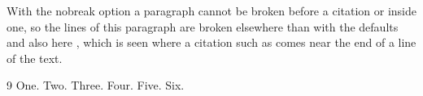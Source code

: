 \documentclass{article}
\begin{document}
With the nobreak option a paragraph cannot be broken before a citation or inside one, so the lines of this paragraph are broken elsewhere than with the defaults \cite[see the long note here]{a,c,e} and also here \cite{b,a,f,e,d}, which is seen where a citation such as \cite{a,c,e} comes near the end of a line of the text.

\begin{thebibliography}{9}
 One.
 Two.
 Three.
 Four.
 Five.
 Six.
\end{thebibliography}
\end{document}
